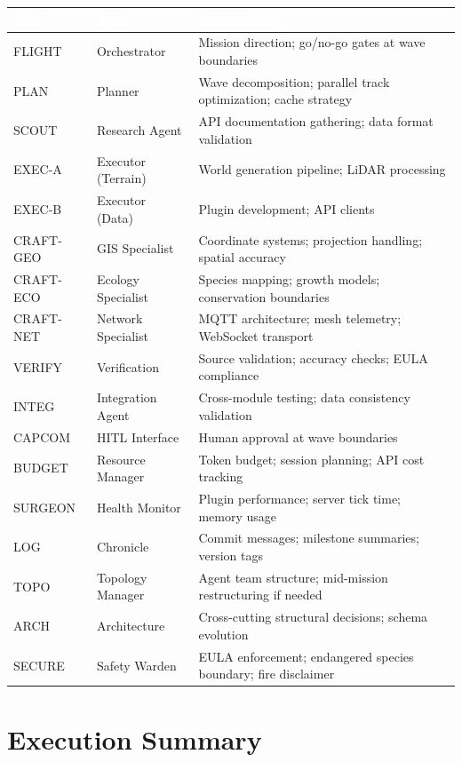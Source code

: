 \documentclass[11pt,letterpaper]{article}
\newcommand{\tableheader}[1]{\textbf{\sffamily\textcolor{white}{#1}}}
\begin{document}
\begin{center}
\begin{tabularx}{\textwidth}{L{2.2cm}L{2.5cm}X}
\toprule
{}
\tableheader{Role} & \tableheader{Agent} & \tableheader{Responsibility} \\
\midrule
FLIGHT & Orchestrator & Mission direction; go/no-go gates at wave boundaries \\
PLAN & Planner & Wave decomposition; parallel track optimization; cache strategy \\
SCOUT & Research Agent & API documentation gathering; data format validation \\
EXEC-A & Executor (Terrain) & World generation pipeline; LiDAR processing \\
EXEC-B & Executor (Data) & Plugin development; API clients \\
CRAFT-GEO & GIS Specialist & Coordinate systems; projection handling; spatial accuracy \\
CRAFT-ECO & Ecology Specialist & Species mapping; growth models; conservation boundaries \\
CRAFT-NET & Network Specialist & MQTT architecture; mesh telemetry; WebSocket transport \\
VERIFY & Verification & Source validation; accuracy checks; EULA compliance \\
INTEG & Integration Agent & Cross-module testing; data consistency validation \\
CAPCOM & HITL Interface & Human approval at wave boundaries \\
BUDGET & Resource Manager & Token budget; session planning; API cost tracking \\
SURGEON & Health Monitor & Plugin performance; server tick time; memory usage \\
LOG & Chronicle & Commit messages; milestone summaries; version tags \\
TOPO & Topology Manager & Agent team structure; mid-mission restructuring if needed \\
ARCH & Architecture & Cross-cutting structural decisions; schema evolution \\
SECURE & Safety Warden & EULA enforcement; endangered species boundary; fire disclaimer \\
\bottomrule
\end{tabularx}
\end{center}

\section{Execution Summary}
\end{document}
